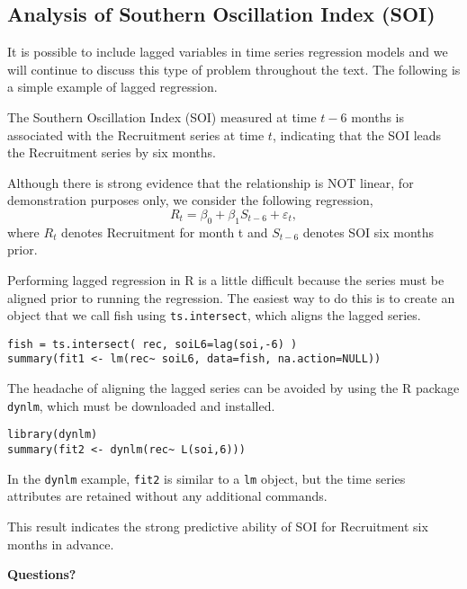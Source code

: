 \documentclass[
paper=128mm:96mm, %
fontsize=9.5pt, %
pagesize, %
parskip=half-, %
]{scrartcl} %
\theoremstyle{mythmstyle} %
\begin{document}
\subsection{Analysis of Southern Oscillation Index (SOI)}

It is possible to include lagged variables in time series regression models and we will continue to discuss this type of problem throughout the text. The following is a simple example of lagged regression.

The Southern Oscillation Index (SOI) measured at time $t-6$ months is associated with the Recruitment series at time $t$, indicating that the SOI leads the Recruitment series by six months. 

Although there is strong evidence that the relationship is NOT linear, for demonstration purposes only, we consider the following regression,
%
\begin{equation}
R_t=\beta_0+\beta_1 S_{t-6}+\varepsilon_t,
\end{equation}
where $R_t$ denotes Recruitment for month t and $S_{t-6}$ denotes SOI six months
prior.
\clearpage

Performing lagged regression in R is a little difficult because the series must be aligned prior to running the regression. The easiest way to do this is to create an object that we call fish using \texttt{ts.intersect}, which aligns the lagged series.
%
\begin{lstlisting}[belowskip=-0.8 \baselineskip]
fish = ts.intersect( rec, soiL6=lag(soi,-6) )
summary(fit1 <- lm(rec~ soiL6, data=fish, na.action=NULL))
\end{lstlisting}
The headache of aligning the lagged series can be avoided by using the R package \texttt{dynlm}, which must be downloaded and installed.
\begin{lstlisting}[belowskip=-0.8 \baselineskip]
library(dynlm)
summary(fit2 <- dynlm(rec~ L(soi,6)))
\end{lstlisting}

In the \texttt{dynlm} example, \texttt{fit2} is similar to a \texttt{lm} object, but the time series attributes are retained without any additional commands.


This result indicates the strong predictive ability of SOI for Recruitment six months in advance.
\clearpage

\thispagestyle{empty} %

\begin{flushright}
\vspace{0.6cm}
\color{white}\sffamily
{\bfseries\LARGE Questions?\par} %
\vfill
\end{flushright}

\end{document}
